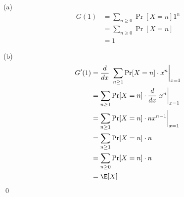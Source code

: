 
(a)
\begin{align*}
G(1) &= \sum_{n \geq 0} \Pr[X = n] 1^n\\
&= \sum_{n \geq 0} \Pr[X = n] \\
&= 1
\end{align*}

(b)
\begin{align*}
G'(1)
&= \frac{d}{dx} \ \sum_{n \geq 1} \Pr[X = n] \cdot x^{n} \biggr|_{x = 1}\\
&= \sum_{n \geq 1} \Pr[X = n] \cdot \frac{d}{dx} \ x^{n} \biggr|_{x = 1}\\
&= \sum_{n \geq 1} \Pr[X = n] \cdot nx^{n-1} \biggr|_{x = 1}\\
&= \sum_{n \geq 1} \Pr[X = n] \cdot n\\
&= \sum_{n \geq 0} \Pr[X = n] \cdot n\\
&= \E[X]
\end{align*}
\qed
